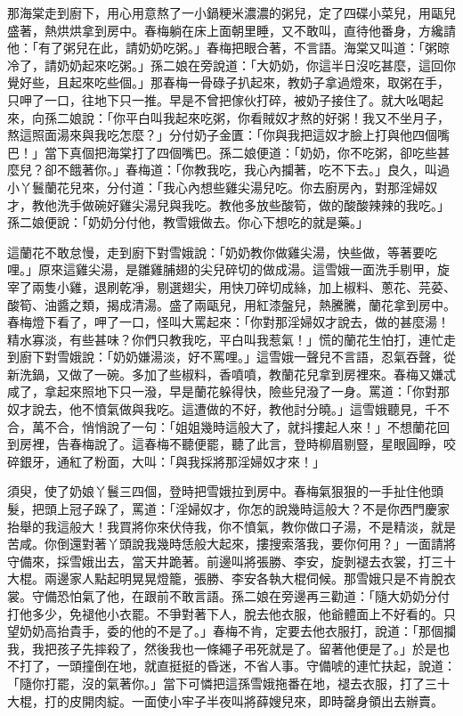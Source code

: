 那海棠走到廚下，用心用意熬了一小鍋粳米濃濃的粥兒，定了四碟小菜兒，用甌兒盛著，熱烘烘拿到房中。春梅躺在床上面朝里睡，又不敢叫，直待他番身，方纔請他：「有了粥兒在此，請奶奶吃粥。」春梅把眼合著，不言語。海棠又叫道：「粥晾冷了，請奶奶起來吃粥。」孫二娘在旁說道：「大奶奶，你這半日沒吃甚麼，這回你覺好些，且起來吃些個。」那春梅一骨碌子扒起來，教奶子拿過燈來，取粥在手，只呷了一口，往地下只一推。早是不曾把傢伙打碎，被奶子接住了。就大吆喝起來，向孫二娘說：「你平白叫我起來吃粥，你看賊奴才熬的好粥！我又不坐月子，熬這照面湯來與我吃怎麼？」分付奶子金匱：「你與我把這奴才臉上打與他四個嘴巴！」當下真個把海棠打了四個嘴巴。孫二娘便道：「奶奶，你不吃粥，卻吃些甚麼兒？卻不餓著你。」春梅道：「你教我吃，我心內攔著，吃不下去。」良久，叫過小丫鬟蘭花兒來，分付道：「我心內想些雞尖湯兒吃。你去廚房內，對那淫婦奴才，教他洗手做碗好雞尖湯兒與我吃。教他多放些酸筍，做的酸酸辣辣的我吃。」孫二娘便說：「奶奶分付他，教雪娥做去。你心下想吃的就是藥。」

這蘭花不敢怠慢，走到廚下對雪娥說：「奶奶教你做雞尖湯，快些做，等著要吃哩。」原來這雞尖湯，是雛雞脯翅的尖兒碎切的做成湯。這雪娥一面洗手剔甲，旋宰了兩隻小雞，退刷乾凈，剔選翅尖，用快刀碎切成絲，加上椒料、蔥花、芫荽、酸筍、油醬之類，揭成清湯。盛了兩甌兒，用紅漆盤兒，熱騰騰，蘭花拿到房中。春梅燈下看了，呷了一口，怪叫大罵起來：「你對那淫婦奴才說去，做的甚麼湯！精水寡淡，有些甚味？你們只教我吃，平白叫我惹氣！」慌的蘭花生怕打，連忙走到廚下對雪娥說：「奶奶嫌湯淡，好不罵哩。」這雪娥一聲兒不言語，忍氣吞聲，從新洗鍋，又做了一碗。多加了些椒料，香噴噴，教蘭花兒拿到房裡來。春梅又嫌忒咸了，拿起來照地下只一潑，早是蘭花躲得快，險些兒潑了一身。罵道：「你對那奴才說去，他不憤氣做與我吃。這遭做的不好，教他討分曉。」這雪娥聽見，千不合，萬不合，悄悄說了一句：「姐姐幾時這般大了，就抖摟起人來！」不想蘭花回到房裡，告春梅說了。這春梅不聽便罷，聽了此言，登時柳眉剔豎，星眼圓睜，咬碎銀牙，通紅了粉面，大叫：「與我採將那淫婦奴才來！」

須臾，使了奶娘丫鬟三四個，登時把雪娥拉到房中。春梅氣狠狠的一手扯住他頭髮，把頭上冠子跺了，罵道：「淫婦奴才，你怎的說幾時這般大？不是你西門慶家抬舉的我這般大！我買將你來伏侍我，你不憤氣，教你做口子湯，不是精淡，就是苦咸。你倒還對著丫頭說我幾時恁般大起來，摟搜索落我，要你何用？」一面請將守備來，採雪娥出去，當天井跪著。前邊叫將張勝、李安，旋剝褪去衣裳，打三十大棍。兩邊家人點起明晃晃燈籠，張勝、李安各執大棍伺候。那雪娥只是不肯脫衣裳。守備恐怕氣了他，在跟前不敢言語。孫二娘在旁邊再三勸道：「隨大奶奶分付打他多少，免褪他小衣罷。不爭對著下人，脫去他衣服，他爺體面上不好看的。只望奶奶高抬貴手，委的他的不是了。」春梅不肯，定要去他衣服打，說道：「那個攔我，我把孩子先摔殺了，然後我也一條繩子弔死就是了。留著他便是了。」於是也不打了，一頭撞倒在地，就直挺挺的昏迷，不省人事。守備唬的連忙扶起，說道：「隨你打罷，沒的氣著你。」當下可憐把這孫雪娥拖番在地，褪去衣服，打了三十大棍，打的皮開肉綻。一面使小牢子半夜叫將薛嫂兒來，即時罄身領出去辦賣。

